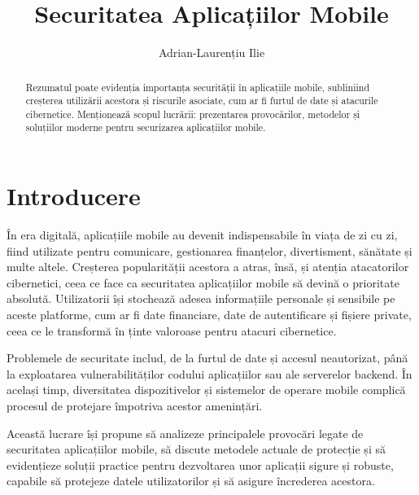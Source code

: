 \documentclass[runningheads]{llncs}
\begin{document}
%
\title{Securitatea Aplicațiilor Mobile}
%
%
\author{Adrian-Laurențiu Ilie}
%
%
%
\maketitle              %
%
\begin{abstract}
Rezumatul poate evidenția importanța securității în 
aplicațiile mobile, subliniind creșterea utilizării acestora 
și riscurile asociate, cum ar fi furtul de date și atacurile 
cibernetice. Menționează scopul lucrării: prezentarea 
provocărilor, metodelor și soluțiilor moderne pentru 
securizarea aplicațiilor mobile.

\end{abstract}
%
%
%
\section{Introducere}
În era digitală, aplicațiile mobile au devenit indispensabile în viața de zi cu zi, fiind utilizate pentru comunicare, gestionarea finanțelor, divertisment, sănătate și multe altele. Creșterea popularității acestora a atras, însă, și atenția atacatorilor cibernetici, ceea ce face ca securitatea aplicațiilor mobile să devină o prioritate absolută. Utilizatorii își stochează adesea informațiile personale și sensibile pe aceste platforme, cum ar fi date financiare, date de autentificare și fișiere private, ceea ce le transformă în ținte valoroase pentru atacuri cibernetice.

Problemele de securitate includ, de la furtul de date și accesul neautorizat, până la exploatarea vulnerabilităților codului aplicațiilor sau ale serverelor backend. În același timp, diversitatea dispozitivelor și sistemelor de operare mobile complică procesul de protejare împotriva acestor amenințări.

Această lucrare își propune să analizeze principalele provocări legate de securitatea aplicațiilor mobile, să discute metodele actuale de protecție și să evidențieze soluții practice pentru dezvoltarea unor aplicații sigure și robuste, capabile să protejeze datele utilizatorilor și să asigure încrederea acestora.
\end{document}
